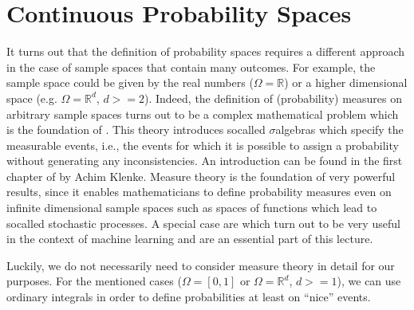 \documentclass[letterpaper,10pt,english]{jupyterBook}
\begin{document}
\section{Continuous Probability Spaces}
\label{\detokenize{fund/fundprob:continuous-probability-spaces}}
\sphinxAtStartPar
It turns out that the definition of probability spaces requires a different approach in the case of sample spaces that contain  many outcomes. For example, the sample space could be given by the real numbers (\(\Omega = \mathbb{R}\)) or a higher dimensional space (e.g. \(\Omega = \mathbb{R}^d\), \(d >= 2\)). Indeed, the definition of (probability) measures on arbitrary sample spaces turns out to be a complex mathematical problem which is the foundation of . This theory introduces so\sphinxhyphen{}called \(\sigma\)\sphinxhyphen{}algebras which specify the measurable events, i.e., the events for which it is possible to assign a probability without generating any inconsistencies. An introduction can be found in the first chapter of  by Achim Klenke. Measure theory is the foundation of very powerful results, since it enables mathematicians to define probability measures even on infinite dimensional sample spaces such as spaces of functions which lead to so\sphinxhyphen{}called stochastic processes. A special case are  which turn out to be very useful in the context of machine learning and are an essential part of this lecture.

\sphinxAtStartPar
Luckily, we do not necessarily need to consider measure theory in detail for our purposes. For the mentioned cases (\(\mathbb{\Omega} = [0, 1]\) or \(\Omega = \mathbb{R}^d\), \(d >= 1\)), we can use ordinary integrals in order to define probabilities at least on “nice” events.
\end{document}
